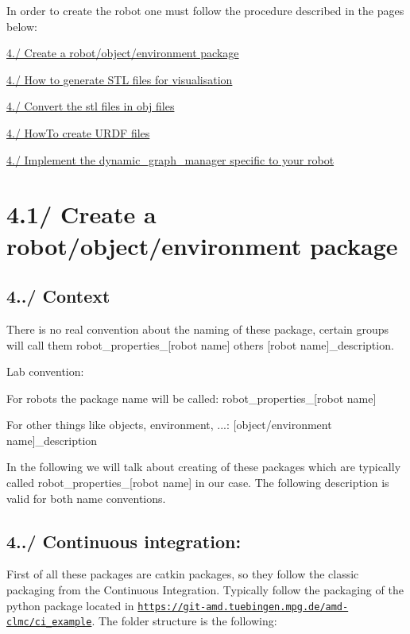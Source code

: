 In order to create the robot one must follow the procedure described in the pages below\+:

\hyperlink{subsubpage_robot_package}{4./ Create a robot/object/environment package}

\hyperlink{subsubpage_stl}{4./ How to generate S\+TL files for visualisation}

\hyperlink{subsubpage_stl_to_obj}{4./ Convert the stl files in obj files}

\hyperlink{subsubpage_urdf}{4./ How\+To create U\+R\+DF files}

\hyperlink{subsubpage_implement_dgm}{4./ Implement the dynamic\+\_\+graph\+\_\+manager specific to your robot} \hypertarget{subsubpage_robot_package}{}\section{4.1/ Create a robot/object/environment package}\label{subsubpage_robot_package}
\hypertarget{subsubpage_robot_package_robot_properties_context}{}\subsection{4../ Context}\label{subsubpage_robot_package_robot_properties_context}
There is no real convention about the naming of these package, certain groups will call them robot\+\_\+properties\+\_\+\mbox{[}robot name\mbox{]} others \mbox{[}robot name\mbox{]}\+\_\+description.

Lab convention\+:
\begin{DoxyItemize}
\item For robots the package name will be called\+: robot\+\_\+properties\+\_\+\mbox{[}robot name\mbox{]}
\item For other things like objects, environment, ...\+: \mbox{[}object/environment name\mbox{]}\+\_\+description
\end{DoxyItemize}

In the following we will talk about creating of these packages which are typically called robot\+\_\+properties\+\_\+\mbox{[}robot name\mbox{]} in our case. The following description is valid for both name conventions.\hypertarget{subsubpage_robot_package_robot_properties_ci}{}\subsection{4../ Continuous integration\+:}\label{subsubpage_robot_package_robot_properties_ci}
First of all these packages are catkin packages, so they follow the classic packaging from the Continuous Integration. Typically follow the packaging of the python package located in \href{https://git-amd.tuebingen.mpg.de/amd-clmc/ci_example}{\tt https\+://git-\/amd.\+tuebingen.\+mpg.\+de/amd-\/clmc/ci\+\_\+example}. The folder structure is the following\+:


